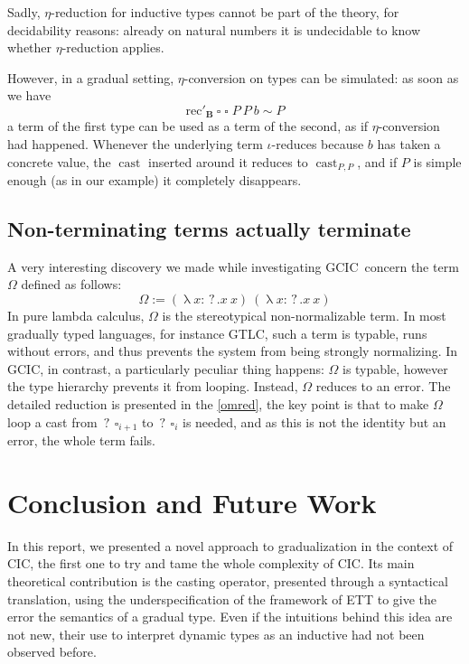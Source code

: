 \documentclass{kaobook}
\renewcommand{\mathtt}{\mathrm}
\newcommand{\uni}[1][]{\square_{#1}}
\newcommand{\cons}{\sim}
\DeclareMathOperator{\?}{?}
\renewcommand{\l}{\operatorname{\lambda}}
\newcommand{\rec}{\mathtt{rec}}
\newcommand{\bool}{\mathbf{B}}
\newcommand{\cas}{\operatorname{\mathtt{cast}}}
\newcommand{\cast}[3]{\cas_{#1,#2}#3}
\newcommand{\gcic}{GCIC}
\begin{document}
{Sadly, $\eta$-reduction for inductive types cannot be part of the theory, for decidability reasons: already on natural numbers it is undecidable to know whether $\eta$-reduction applies.

However, in a gradual setting, $\eta$-conversion on types can be simulated: as soon as we have
\[\rec'_{\bool}~\uni~\uni~P~P~b \cons P \]
a term of the first type can be used as a term of the second, as if $\eta$-conversion had happened. Whenever the underlying term $\iota$-reduces because $b$ has taken a concrete value, the $\cas$ inserted around it reduces to $\cast{P}{P}{}$, and if $P$ is simple enough (as in our example) it completely disappears.

\subsection{Non-terminating terms actually terminate}
\label{omexs}

A very interesting discovery we made while investigating \gcic\ concern the term $\Omega$ defined as follows:
\[\Omega := (\l x : \? . x~x)~(\l x : \? . x~x) \]
In pure lambda calculus, $\Omega$ is the stereotypical non-normalizable term. In most gradually typed languages, for instance GTLC, such a term is typable, runs without errors, and thus prevents the system from being strongly normalizing. In \gcic, in contrast, a particularly peculiar thing happens: $\Omega$ is typable, however the type hierarchy prevents it from looping. Instead, $\Omega$ reduces to an error. The detailed reduction is presented in the \autoref{omred}, the key point is that to make $\Omega$ loop a cast from $\?~\uni[i+1]$ to $\?~\uni[i]$ is needed, and as this is not the identity but an error, the whole term fails.

\section*{Conclusion and Future Work}

In this report, we presented a novel approach to gradualization in the context of CIC, the first one to try and tame the whole complexity of CIC. Its main theoretical contribution is the casting operator, presented through a syntactical translation, using the underspecification of the framework of ETT to give the error the semantics of a gradual type. Even if the intuitions behind this idea are not new, their use to interpret dynamic types as an inductive had not been observed before.

}
\end{document}
